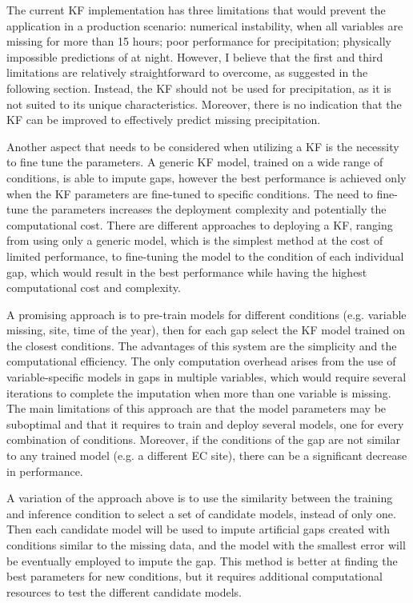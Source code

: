 \documentclass{article}
\begin{document}
The current KF implementation has three limitations that would prevent the application in a production scenario: numerical instability, when all variables are missing for more than 15 hours; poor performance for precipitation; physically impossible predictions of  at night. However, I believe that the first and third limitations are relatively straightforward to overcome, as suggested in the following section. Instead, the KF should not be used for precipitation, as it is not suited to its unique characteristics. Moreover, there is no indication that the KF can be improved to effectively predict missing precipitation.

Another aspect that needs to be considered when utilizing a KF is the necessity to fine tune the parameters.
A generic KF model, trained on a wide range of conditions, is able to impute gaps, however the best performance is achieved only when the KF parameters are fine-tuned to specific conditions.
The need to fine-tune the parameters increases the deployment complexity and potentially the computational cost.
There are different approaches to deploying a KF, ranging from using only a generic model, which is the simplest method at the cost of limited performance, to fine-tuning the model to the condition of each individual gap, which would result in the best performance while having the highest computational cost and complexity.

A promising approach is to pre-train models for different conditions (e.g. variable missing, site, time of the year), then for each gap select the KF model trained on the closest conditions. The advantages of this system are the simplicity and the computational efficiency. The  only computation overhead arises from the use of variable-specific models in gaps in multiple variables, which would require several iterations to complete the imputation when more than one variable is missing.
The main limitations of this approach are that the model parameters may be suboptimal and that it requires to train and deploy several models, one for every combination of conditions.
Moreover, if the conditions of the gap are not similar to any trained model (e.g. a different EC site), there can be a significant decrease in performance.

A variation of the approach above is to use the similarity between the training and inference condition to select a set of candidate models, instead of only one. Then each candidate model will be used to impute artificial gaps created with conditions similar to the missing data, and the model with the smallest error will be eventually employed to impute the gap. This method is better at finding the best parameters for new conditions, but it requires additional computational resources to test the different candidate models.
\end{document}
